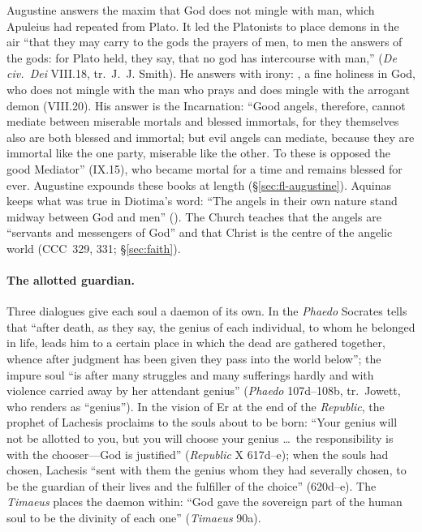 Augustine answers the maxim that God does not mingle with man, which
Apuleius had repeated from Plato. It led the Platonists to place demons
in the air ``that they may carry to the gods the prayers of men, to men
the answers of the gods: for Plato held, they say, that no god has
intercourse with man,''  (\emph{De civ.\ Dei} VIII.18, tr.\ J.~J.
Smith). He answers with irony: , a
fine holiness in God, who does not mingle with the man who prays and
does mingle with the arrogant demon (VIII.20). His
answer is the Incarnation: ``Good angels, therefore, cannot mediate
between miserable mortals and blessed immortals, for they themselves also
are both blessed and immortal; but evil angels can mediate, because they
are immortal like the one party, miserable like the other. To these is
opposed the good Mediator'' (IX.15), who became mortal for a time and
remains blessed for ever. Augustine expounds these books
at length (\S\ref{sec:fl-augustine}). Aquinas keeps what was true in
Diotima's word: ``The angels in their own nature stand midway between
God and men'' (). The Church teaches that the angels are ``servants and messengers of God''
and that Christ is the centre of the angelic world (CCC~329, 331;
\S\ref{sec:faith}).

\paragraph{The allotted guardian.} Three dialogues give each soul a
daemon of its own. In the \emph{Phaedo} Socrates tells that ``after
death, as they say, the genius of each individual, to whom he belonged in
life, leads him to a certain place in which the dead are gathered
together, whence after judgment has been given they pass into the world
below''; the impure soul ``is after many struggles and many sufferings
hardly and with violence carried away by her attendant genius''
(\emph{Phaedo} 107d--108b, tr.\ Jowett, who renders  as
``genius''). In the vision of Er at the end of the \emph{Republic}, the
prophet of Lachesis proclaims to the souls about to be born: ``Your
genius will not be allotted to you, but you will choose your genius
\dots\ the responsibility is with the chooser---God is justified''
(\emph{Republic} X 617d--e); when the souls had chosen, Lachesis ``sent
with them the genius whom they had severally chosen, to be the guardian
of their lives and the fulfiller of the choice'' (620d--e). The
\emph{Timaeus} places the daemon within: ``God gave the sovereign part
of the human soul to be the divinity of each one'' (\emph{Timaeus} 90a).

